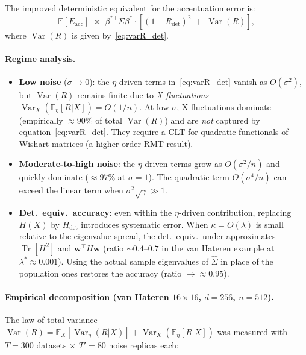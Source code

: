 The improved deterministic equivalent for the accentuation error is:
\begin{equation}
  \mathbb{E}\!\left[E_{\mathrm{acc}}\right]
  \;\asymp\;
  \beta^{*\top}\Sigma\beta^{*}
  \cdot
  \left[
    (1-R_{\det})^{2}
    \;+\;
    \operatorname{Var}(R)
  \right],
  \label{eq:Eacc_full}
\end{equation}
where $\operatorname{Var}(R)$ is given by~\eqref{eq:varR_det}.

\paragraph{Regime analysis.}
\begin{itemize}
\item \textbf{Low noise} ($\sigma\to 0$): the $\eta$-driven terms
  in~\eqref{eq:varR_det} vanish as $O(\sigma^{2})$, but $\operatorname{Var}(R)$
  remains finite due to \emph{X-fluctuations}
  $\operatorname{Var}_{X}(\mathbb{E}_{\eta}[R|X])=O(1/n)$.
  At low $\sigma$, X-fluctuations dominate
  (empirically $\approx 90\%$ of total $\operatorname{Var}(R)$) and are
  \emph{not} captured by equation~\eqref{eq:varR_det}.
  They require a CLT for quadratic functionals of Wishart matrices
  (a higher-order RMT result).
\item \textbf{Moderate-to-high noise}: the $\eta$-driven terms grow as
  $O(\sigma^{2}/n)$ and quickly dominate ($\approx 97\%$ at $\sigma=1$).
  The quadratic term $O(\sigma^{4}/n)$ can exceed the linear term when
  $\sigma^{2}\sqrt{\gamma}\gg 1$.
\item \textbf{Det.\ equiv.\ accuracy}: even within the $\eta$-driven
  contribution, replacing $H(X)$ by $H_{\det}$ introduces systematic
  error.  When $\kappa=O(\lambda)$ is small relative to the eigenvalue
  spread, the det.\ equiv.\ under-approximates $\operatorname{Tr}[H^{2}]$
  and $\mathbf{w}^{\top}H\mathbf{w}$ (ratio $\sim 0.4$--$0.7$
  in the van Hateren example at $\lambda^{*}\approx 0.001$).
  Using the actual sample eigenvalues of $\hat{\Sigma}$ in place of
  the population ones restores the accuracy (ratio $\to\approx 0.95$).
\end{itemize}

\paragraph{Empirical decomposition (van Hateren $16\times 16$, $d=256$, $n=512$).}

The law of total variance $\operatorname{Var}(R)=\mathbb{E}_{X}[\operatorname{Var}_{\eta}(R|X)]+\operatorname{Var}_{X}(\mathbb{E}_{\eta}[R|X])$ was measured with $T=300$ datasets $\times$ $T'=80$ noise replicas each:

